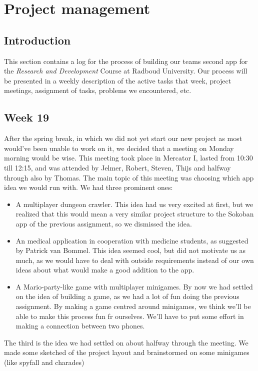 \documentclass[../main.tex]{subfiles}
\begin{document}
\pagebreak
\section{Project management}
\subsection*{Introduction}
This section contains a log for the process of building our teams second app for the \textit{Research and Development} Course at Radboud University.
Our process will be presented in a weekly description of the active tasks that week, project meetings, assignment of tasks, problems we encountered, etc.

\subsection*{Week 19}
After the spring break, in which we did not yet start our new project as most would've been unable to work on it, we decided that a meeting on Monday morning would be wise. This meeting took place in Mercator I, lasted from 10:30 till 12:15, and was attended by Jelmer, Robert, Steven, Thijs and halfway through also by Thomas.
The main topic of this meeting was choosing which app idea we would run with. We had three prominent ones:
\begin{itemize}
	\item A multiplayer dungeon crawler. This idea had us very excited at first, but we realized that this would mean a very similar project structure to the Sokoban app of the previous assignment, so we dismissed the idea.
	\item An medical application in cooperation with medicine students, as suggested by Patrick van Bommel. This idea seemed cool, but did not motivate us as much, as we would have to deal with outside requirements instead of our own ideas about what would make a good addition to the app.
	\item A Mario-party-like game with multiplayer minigames. By now we had settled on the idea of building a game, as we had a lot of fun doing the previous assignment. By making a game centred around minigames, we think we'll be able to make this process fun fr ourselves. We'll have to put some effort in making a connection between two phones.
\end{itemize}

The third is the idea we had settled on about halfway through the meeting. We made some sketched of the project layout and brainstormed on some minigames (like spyfall and charades)
\end{document}
